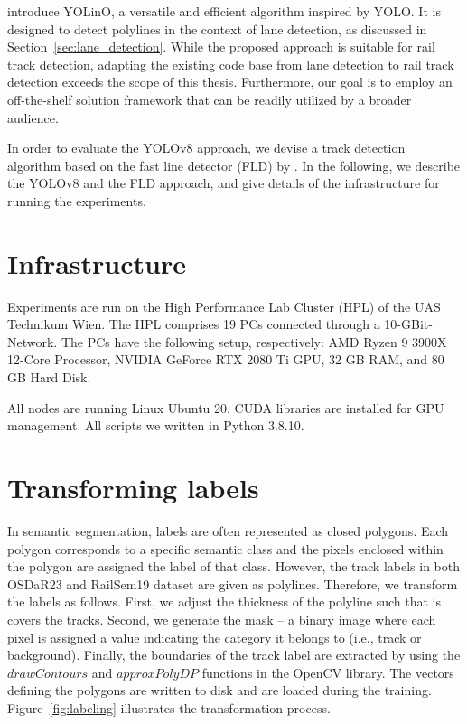 \documentclass[Master,MDS,english]{BASE/twbook} %
\begin{document}
\cite{meyer2021yolino} introduce YOLinO, a versatile and efficient algorithm inspired by YOLO. It is designed to detect polylines in the context of lane detection, as discussed in Section~\ref{sec:lane_detection}. While the proposed approach is suitable for rail track detection, adapting the existing code base from lane detection to rail track detection exceeds the scope of this thesis. Furthermore, our goal is to employ an off-the-shelf solution framework that can be readily utilized by a broader audience.

In order to evaluate the YOLOv8 approach, we devise a track detection algorithm based on the fast line detector (FLD) by \cite{FLD}.
In the following, we describe the YOLOv8 and the FLD approach, and give details of the infrastructure for running the experiments.

\section{Infrastructure}

Experiments are run on the High Performance Lab Cluster (HPL) of the UAS Technikum Wien. 
The HPL comprises 19 PCs connected through a 10-GBit-Network. The PCs have the following setup, respectively: AMD Ryzen 9 3900X 12-Core Processor, NVIDIA GeForce RTX 2080 Ti GPU, 32 GB RAM, and 80 GB Hard Disk.

All nodes are running Linux Ubuntu 20. CUDA libraries are installed for GPU management. All scripts we written in Python 3.8.10. 


\section{Transforming labels} 

In semantic segmentation, labels are often represented as closed polygons. Each polygon corresponds to a specific semantic class and the pixels enclosed within the polygon are assigned the label of that class.
However, the track labels in both OSDaR23 and RailSem19 dataset are given as polylines. Therefore, we transform the labels as follows. First, we adjust the thickness of the polyline such that is covers the tracks. Second, we generate the mask -- a binary image where each pixel is assigned a value indicating the category it belongs to (i.e., track or background). Finally, the boundaries of the track label are extracted by using the $drawContours$ and $approxPolyDP$ functions in the OpenCV library. The vectors defining the polygons are written to disk and are loaded during the training.  Figure~\ref{fig:labeling} illustrates the transformation process.
\end{document}
